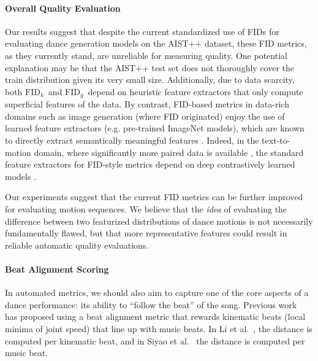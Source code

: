 \documentclass[10pt,twocolumn,letterpaper]{article}
\newcommand{\fidg}{$\text{FID}_g$~}
\newcommand{\fidk}{$\text{FID}_k$~}
\begin{document}
\paragraph{Overall Quality Evaluation}

Our results suggest that despite the current standardized use of FIDs for evaluating dance generation models on the AIST++ dataset, these FID metrics, as they currently stand, are unreliable for measuring quality.
One potential explanation may be that the AIST++ test set does not thoroughly cover the train distribution given its very small size.
Additionally, due to data scarcity, both \fidk and \fidg depend on heuristic feature extractors that only compute superficial features of the data.
By contrast, FID-based metrics in data-rich domains such as image generation (where FID originated) enjoy the use of learned feature extractors (e.g. pre-trained ImageNet models), which are known to directly extract semantically meaningful features \cite{sharif2014cnn}.
Indeed, in the text-to-motion domain, where significantly more paired data is available \cite{guo2022generating}, the standard feature extractors for FID-style metrics depend on deep contrastively learned models \cite{tevet2022human, zhang2022motiondiffuse}.

Our experiments suggest that the current FID metrics can be further improved for evaluating motion sequences.
We believe that the \emph{idea} of evaluating the difference between two featurized distributions of dance motions is not necessarily fundamentally flawed, but that more representative features could result in reliable automatic quality evaluations.

\paragraph{Beat Alignment Scoring}
\label{par:beat_alignment_discussion}

In automated metrics, we should also aim to capture one of the core aspects of a dance performance: its ability to ``follow the beat'' of the song.
Previous work~\cite{li2021ai,siyao2022bailando} has proposed using a beat alignment metric that rewards kinematic beats (local minima of joint speed) that line up with music beats.
In Li et al.~\cite{li2021ai}, the distance is computed per kinematic beat, and in Siyao et al.~\cite{siyao2022bailando} the distance is computed per music beat.
\end{document}
